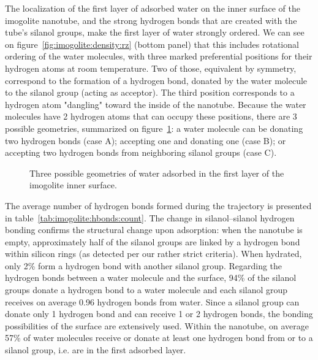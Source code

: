 \documentclass[thesis]{subfiles}
\begin{document}
The localization of the first layer of adsorbed water on the inner surface of
the imogolite nanotube, and the strong hydrogen bonds that are created with the
tube's silanol groups, make the first layer of water strongly ordered. We can
see on figure~\ref{fig:imogolite:density:rz} (bottom panel) that this includes rotational
ordering of the water molecules, with three marked preferential positions for
their hydrogen atoms at room temperature. Two of those, equivalent by symmetry,
correspond to the formation of a hydrogen bond, donated by the water molecule to
the silanol group (acting as acceptor). The third position corresponds to a
hydrogen atom "dangling" toward the inside of the nanotube. Because the water
molecules have 2 hydrogen atoms that can occupy these positions, there are 3
possible geometries, summarized on figure~\ref{fig:imogolite:hbonds:surface}: a water molecule
can be donating two hydrogen bonds (case A); accepting one and donating one
(case B); or accepting two hydrogen bonds from neighboring silanol groups (case
C).

\begin{figure}
\centering
	\caption{Three possible geometries of water adsorbed in the first layer of the imogolite inner surface.}
    \label{fig:imogolite:hbonds:surface}
\end{figure}




The average number of hydrogen bonds formed during the trajectory is presented
in table~\ref{tab:imogolite:hbonds:count}. The change in silanol--silanol hydrogen bonding
confirms the structural change upon adsorption: when the nanotube is empty,
approximately half of the silanol groups are linked by a hydrogen bond within
silicon rings (as detected per our rather strict criteria). When hydrated, only
2\% form a hydrogen bond with another silanol group. Regarding the hydrogen
bonds between a water molecule and the surface, 94\% of the silanol groups
donate a hydrogen bond to a water molecule and each silanol group receives on
average 0.96 hydrogen bonds from water. Since a silanol group can donate only 1
hydrogen bond and can receive 1 or 2 hydrogen bonds, the bonding possibilities
of the surface are extensively used. Within the nanotube, on average 57\% of
water molecules receive or donate at least one hydrogen bond from or to a
silanol group, i.e. are in the first adsorbed layer.
\end{document}
